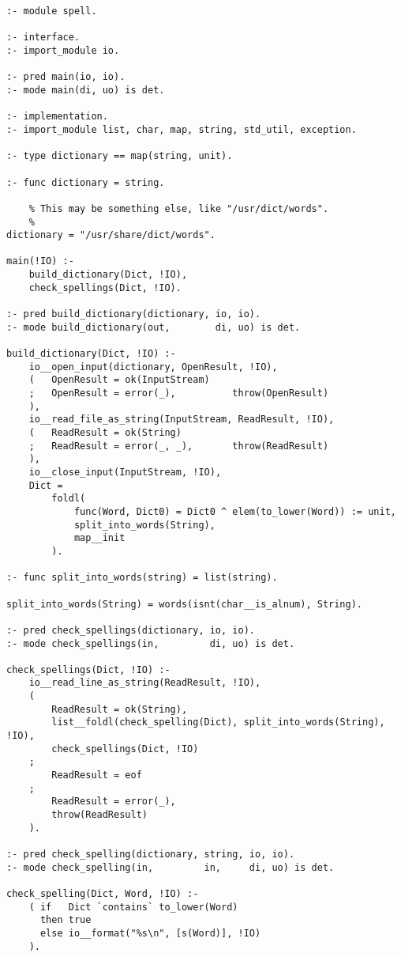 \begin{verbatim}
:- module spell.

:- interface.
:- import_module io.

:- pred main(io, io).
:- mode main(di, uo) is det.

:- implementation.
:- import_module list, char, map, string, std_util, exception.

:- type dictionary == map(string, unit).

:- func dictionary = string.

    % This may be something else, like "/usr/dict/words".
    %
dictionary = "/usr/share/dict/words".

main(!IO) :-
    build_dictionary(Dict, !IO),
    check_spellings(Dict, !IO).

:- pred build_dictionary(dictionary, io, io).
:- mode build_dictionary(out,        di, uo) is det.

build_dictionary(Dict, !IO) :-
    io__open_input(dictionary, OpenResult, !IO),
    (   OpenResult = ok(InputStream)
    ;   OpenResult = error(_),          throw(OpenResult)
    ),
    io__read_file_as_string(InputStream, ReadResult, !IO),
    (   ReadResult = ok(String)
    ;   ReadResult = error(_, _),       throw(ReadResult)
    ),
    io__close_input(InputStream, !IO),
    Dict =
        foldl(
            func(Word, Dict0) = Dict0 ^ elem(to_lower(Word)) := unit,
            split_into_words(String),
            map__init
        ).

:- func split_into_words(string) = list(string).

split_into_words(String) = words(isnt(char__is_alnum), String).

:- pred check_spellings(dictionary, io, io).
:- mode check_spellings(in,         di, uo) is det.

check_spellings(Dict, !IO) :-
    io__read_line_as_string(ReadResult, !IO),
    (
        ReadResult = ok(String),
        list__foldl(check_spelling(Dict), split_into_words(String), !IO),
        check_spellings(Dict, !IO)
    ;
        ReadResult = eof
    ;
        ReadResult = error(_),
        throw(ReadResult)
    ).

:- pred check_spelling(dictionary, string, io, io).
:- mode check_spelling(in,         in,     di, uo) is det.

check_spelling(Dict, Word, !IO) :-
    ( if   Dict `contains` to_lower(Word)
      then true
      else io__format("%s\n", [s(Word)], !IO)
    ).
\end{verbatim}
